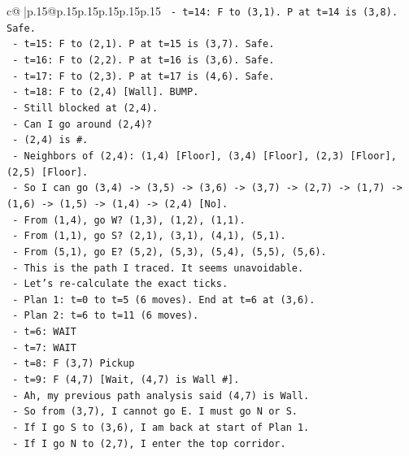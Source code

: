 \documentclass{article}
\begin{document}
{\begin{supertabular}{c@{$\;$}|p{.15\linewidth}@{}p{.15\linewidth}p{.15\linewidth}p{.15\linewidth}p{.15\linewidth}p{.15\linewidth}}
{{{\texttt{     {-} t=14: F to (3,1). P at t=14 is (3,8). Safe.} \\
\texttt{     {-} t=15: F to (2,1). P at t=15 is (3,7). Safe.} \\
\texttt{     {-} t=16: F to (2,2). P at t=16 is (3,6). Safe.} \\
\texttt{     {-} t=17: F to (2,3). P at t=17 is (4,6). Safe.} \\
\texttt{     {-} t=18: F to (2,4) {[}Wall{]}. BUMP.} \\
\texttt{     {-} Still blocked at (2,4).} \\
\texttt{     {-} Can I go around (2,4)?} \\
\texttt{     {-} (2,4) is \#.} \\
\texttt{     {-} Neighbors of (2,4): (1,4) {[}Floor{]}, (3,4) {[}Floor{]}, (2,3) {[}Floor{]}, (2,5) {[}Floor{]}.} \\
\texttt{     {-} So I can go (3,4) {-}> (3,5) {-}> (3,6) {-}> (3,7) {-}> (2,7) {-}> (1,7) {-}> (1,6) {-}> (1,5) {-}> (1,4) {-}> (2,4) {[}No{]}.} \\
\texttt{     {-} From (1,4), go W? (1,3), (1,2), (1,1).} \\
\texttt{     {-} From (1,1), go S? (2,1), (3,1), (4,1), (5,1).} \\
\texttt{     {-} From (5,1), go E? (5,2), (5,3), (5,4), (5,5), (5,6).} \\
\texttt{     {-} This is the path I traced. It seems unavoidable.} \\
\texttt{     {-} Let's re{-}calculate the exact ticks.} \\
\texttt{     {-} Plan 1: t=0 to t=5 (6 moves). End at t=6 at (3,6).} \\
\texttt{     {-} Plan 2: t=6 to t=11 (6 moves).} \\
\texttt{       {-} t=6: WAIT} \\
\texttt{       {-} t=7: WAIT} \\
\texttt{       {-} t=8: F (3,7) Pickup} \\
\texttt{       {-} t=9: F (4,7) {[}Wait, (4,7) is Wall \#{]}.} \\
\texttt{       {-} Ah, my previous path analysis said (4,7) is Wall.} \\
\texttt{       {-} So from (3,7), I cannot go E. I must go N or S.} \\
\texttt{       {-} If I go S to (3,6), I am back at start of Plan 1.} \\
\texttt{       {-} If I go N to (2,7), I enter the top corridor.} \\
}}}
\end{supertabular}}
\end{document}
